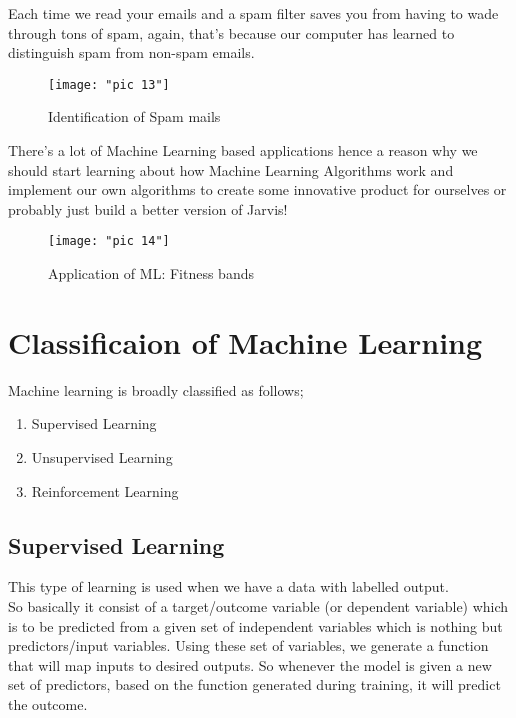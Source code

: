 \documentclass[Proceedings]{ascelike}
\begin{document}
 Each time we read your emails and a spam filter saves you from having to wade through tons of spam, again, that's because our computer has learned to distinguish spam from non-spam emails.\\
 
\begin{figure}[!ht]
 \centering
 \texttt{[image: "pic 13"]}
 \caption{Identification of Spam mails}
 \label{fig:pic-13}
\end{figure}

There's a lot of Machine Learning based applications hence a reason why we should start learning about how Machine Learning Algorithms work and implement our own algorithms to create some innovative product for ourselves or probably just build a better version of Jarvis! 
 \begin{figure}
 	\centering
 	\texttt{[image: "pic 14"]}
 	\caption{Application of ML: Fitness bands}
 	\label{fig:pic-14}
 \end{figure}
 

\newpage
\section{Classificaion of Machine Learning}
Machine learning is broadly classified as follows;
\begin{enumerate}
	\item Supervised Learning
	\item Unsupervised Learning
	\item Reinforcement Learning
\end{enumerate}

\subsection{Supervised Learning}

This type of learning is used when we have a data with labelled output.
\\So basically it consist of a target/outcome variable (or dependent variable) which is to be predicted from a given set of independent variables which is nothing but predictors/input variables. Using these set of variables, we generate a function that will map inputs to desired outputs. So whenever the model is given a new set of predictors, based on the function generated during training, it will predict the outcome.\\
\end{document}
